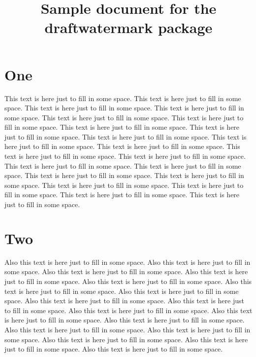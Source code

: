 \documentclass{article}
\title{Sample document for the draftwatermark package}
\begin{document}
\maketitle

\section{One}
This text is here just to fill in some space. This text is here just to
fill in some space. This text is here just to fill in some space. This
text is here just to fill in some space. This text is here just to fill in
some space. This text is here just to fill in some space. This text is
here just to fill in some space. This text is here just to fill in some
space. This text is here just to fill in some space. This text is here
just to fill in some space. This text is here just to fill in some
space. This text is here just to fill in some space. This text is here
just to fill in some space. This text is here just to fill in some
space. This text is here just to fill in some space. This text is here
just to fill in some space. This text is here just to fill in some
space. This text is here just to fill in some space. This text is here
just to fill in some space. This text is here just to fill in some
space. This text is here just to fill in some space.

\section{Two}

Also this text is here just to fill in some space. Also this text is here
just to fill in some space. Also this text is here just to fill in some
space. Also this text is here just to fill in some space. Also this text
is here just to fill in some space. Also this text is here just to fill in
some space. Also this text is here just to fill in some space. Also this
text is here just to fill in some space. Also this text is here just to
fill in some space. Also this text is here just to fill in some
space. Also this text is here just to fill in some space. Also this text
is here just to fill in some space. Also this text is here just to fill in
some space. Also this text is here just to fill in some space. Also this
text is here just to fill in some space. Also this text is here just to
fill in some space. Also this text is here just to fill in some space.
\end{document}
